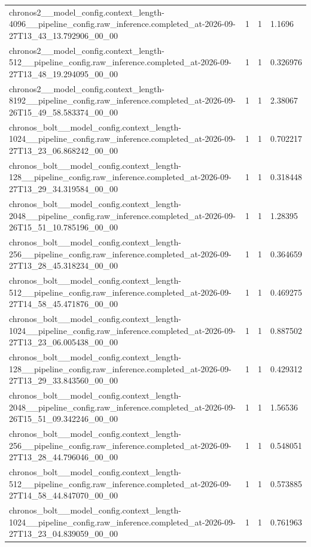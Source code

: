 \begin{tabular}{llll}
chronos2\_\_model\_config.context\_length-4096\_\_pipeline\_config.raw\_inference.completed\_at-2026-09-27T13\_43\_13.792906\_00\_00 & 1 & 1 & 1.1696 \\
chronos2\_\_model\_config.context\_length-512\_\_pipeline\_config.raw\_inference.completed\_at-2026-09-27T13\_48\_19.294095\_00\_00 & 1 & 1 & 0.326976 \\
chronos2\_\_model\_config.context\_length-8192\_\_pipeline\_config.raw\_inference.completed\_at-2026-09-26T15\_49\_58.583374\_00\_00 & 1 & 1 & 2.38067 \\
chronos\_bolt\_\_model\_config.context\_length-1024\_\_pipeline\_config.raw\_inference.completed\_at-2026-09-27T13\_23\_06.868242\_00\_00 & 1 & 1 & 0.702217 \\
chronos\_bolt\_\_model\_config.context\_length-128\_\_pipeline\_config.raw\_inference.completed\_at-2026-09-27T13\_29\_34.319584\_00\_00 & 1 & 1 & 0.318448 \\
chronos\_bolt\_\_model\_config.context\_length-2048\_\_pipeline\_config.raw\_inference.completed\_at-2026-09-26T15\_51\_10.785196\_00\_00 & 1 & 1 & 1.28395 \\
chronos\_bolt\_\_model\_config.context\_length-256\_\_pipeline\_config.raw\_inference.completed\_at-2026-09-27T13\_28\_45.318234\_00\_00 & 1 & 1 & 0.364659 \\
chronos\_bolt\_\_model\_config.context\_length-512\_\_pipeline\_config.raw\_inference.completed\_at-2026-09-27T14\_58\_45.471876\_00\_00 & 1 & 1 & 0.469275 \\
chronos\_bolt\_\_model\_config.context\_length-1024\_\_pipeline\_config.raw\_inference.completed\_at-2026-09-27T13\_23\_06.005438\_00\_00 & 1 & 1 & 0.887502 \\
chronos\_bolt\_\_model\_config.context\_length-128\_\_pipeline\_config.raw\_inference.completed\_at-2026-09-27T13\_29\_33.843560\_00\_00 & 1 & 1 & 0.429312 \\
chronos\_bolt\_\_model\_config.context\_length-2048\_\_pipeline\_config.raw\_inference.completed\_at-2026-09-26T15\_51\_09.342246\_00\_00 & 1 & 1 & 1.56536 \\
chronos\_bolt\_\_model\_config.context\_length-256\_\_pipeline\_config.raw\_inference.completed\_at-2026-09-27T13\_28\_44.796046\_00\_00 & 1 & 1 & 0.548051 \\
chronos\_bolt\_\_model\_config.context\_length-512\_\_pipeline\_config.raw\_inference.completed\_at-2026-09-27T14\_58\_44.847070\_00\_00 & 1 & 1 & 0.573885 \\
chronos\_bolt\_\_model\_config.context\_length-1024\_\_pipeline\_config.raw\_inference.completed\_at-2026-09-27T13\_23\_04.839059\_00\_00 & 1 & 1 & 0.761963 \\

\end{tabular}
